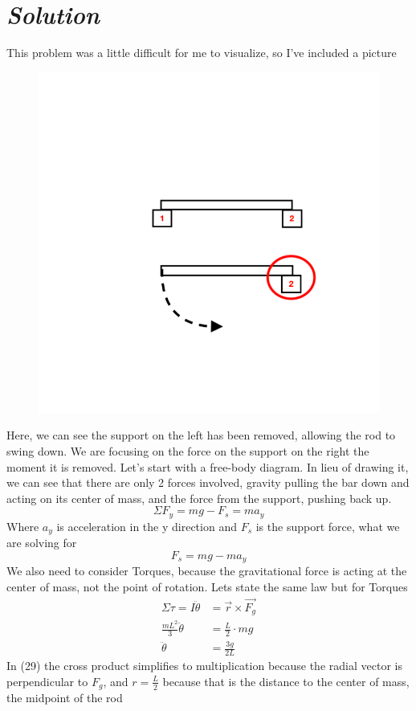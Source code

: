 \documentclass{article}
\begin{document}
\section*{\textit{Solution}} 
This problem was a little difficult for me to visualize, so I've included a picture
\begin{figure}[h]
	\includegraphics[scale=0.5]{P5}
	\centering
\end{figure}
Here, we can see the support on the left has been removed, allowing the rod to swing down. We are focusing on the force on the support on the right the moment it is removed. Let's start with a free-body diagram. In lieu of drawing it, we can see that there are only 2 forces involved, gravity pulling the bar down and acting on its center of mass, and the force from the support, pushing back up. 
\[ \Sigma F_y = mg - F_s = ma_y \]
Where $a_y$ is acceleration in the y direction and $F_s$ is the support force, what we are solving for
\[ F_s = mg - ma_y \]
We also need to consider Torques, because the gravitational force is acting at the center of mass, not the point of rotation. Lets state the same law but for Torques
\begin{align}
	\Sigma \tau = I \ddot{\theta} &= \vec{r} \times \vec{F_g} \\
	\frac{mL^2}{3} \ddot{\theta} &= \frac{L}{2} \cdot mg \\
	\ddot{\theta} &= \frac{3g}{2L}
\end{align}
In (29) the cross product simplifies to multiplication because the radial vector is perpendicular to $F_g$, and $r = \frac{L}{2}$ because that is the distance to the center of mass, the midpoint of the rod \\ \\ 
\end{document}
